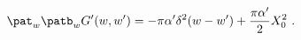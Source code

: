 \begin{equation}
 \pat_w\patb_w G'(w,w') =
 -\pi\alpha'\delta^2(w-w')+\frac{\pi\alpha'}{2}X^2_0 \ .
\end{equation}

